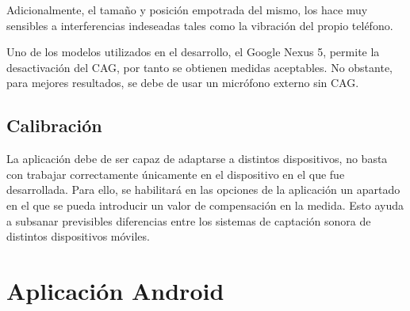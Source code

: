     Adicionalmente, el tamaño y posición empotrada del mismo, los hace muy sensibles a interferencias indeseadas tales como la vibración del propio teléfono.

    Uno de los modelos utilizados en el desarrollo, el Google Nexus 5, permite la desactivación del \ac{CAG}, por tanto se obtienen medidas aceptables. No obstante, para mejores resultados, se debe de usar un micrófono externo sin \ac{CAG}.

\subsection{Calibración}
    La aplicación debe de ser capaz de adaptarse a distintos dispositivos, no basta con trabajar correctamente únicamente en el dispositivo en el que fue desarrollada. Para ello, se habilitará en las opciones de la aplicación un apartado en el que se pueda introducir un valor de compensación en la medida. Esto ayuda a subsanar previsibles diferencias entre los sistemas de captación sonora de distintos dispositivos móviles.

\section{Aplicación Android}

